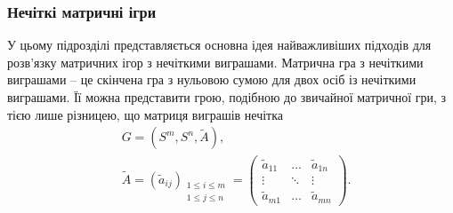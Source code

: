 \documentclass[14pt, a4paper, oneside]{extarticle}
\numberwithin{equation}{section}
\newcommand{\leqslant}{\leq}
\begin{document}
\subsubsection{Нечіткі матричні ігри}
У цьому підрозділі представляється основна ідея найважливіших підходів для розв'язку матричних ігор з нечіткими виграшами. Матрична гра з нечіткими виграшами -- це скінчена гра з нульовою сумою для двох осіб із нечіткими виграшами. Її можна представити грою, подібною до звичайної матричної гри, з тією лише різницею, що матриця виграшів нечітка
\begin{equation*}
\begin{aligned}
& G=\left(S^{m}, S^{n}, \tilde{A}\right), \\
& \tilde{A}=\left(\tilde{a}_{i j}\right)_{\substack{1 \leqslant i \leqslant m \\
1 \leqslant j \leqslant n}}=\left(\begin{array}{llll}
\tilde{a}_{11} & \ldots & \tilde{a}_{1 n} \\
\vdots & \ddots & \vdots \\
\tilde{a}_{m 1} & \ldots & \tilde{a}_{m n}
\end{array}\right).
\end{aligned}
\end{equation*}
\end{document}
